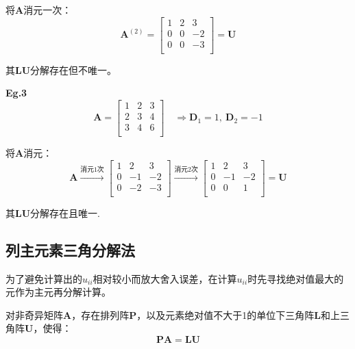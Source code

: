 将$\boldsymbol{A}$消元一次：
\begin{equation*}
    \boldsymbol{A}^{(2)} = \begin{bmatrix}
        1 & 2 & 3 \\
        0 & 0 & -2 \\
        0 & 0 & -3 \\
    \end{bmatrix} = \boldsymbol{U}
\end{equation*}

其$\boldsymbol{LU}$分解存在但不唯一。


\textbf{Eg.3}
\begin{equation*}
    \boldsymbol{A} = \begin{bmatrix}
        1 & 2 & 3 \\
        2 & 3 & 4 \\
        3 & 4 & 6 \\
    \end{bmatrix}\quad
    \Rightarrow \boldsymbol{D}_1 = 1,\ \boldsymbol{D}_2 = -1
\end{equation*}

将$\boldsymbol{A}$消元：
\begin{equation*}
    \boldsymbol{A} \overset{\text{消元1次}}{\longrightarrow} \begin{bmatrix}
        1 & 2 & 3 \\
        0 & -1 & -2 \\
        0 & -2 & -3 \\
    \end{bmatrix} \overset{\text{消元2次}}{\longrightarrow}
    \begin{bmatrix}
        1 & 2 & 3 \\
        0 & -1 & -2 \\
        0 & 0 & 1 \\
    \end{bmatrix} = \boldsymbol{U}
\end{equation*}

其$\boldsymbol{LU}$分解存在且唯一.

\newpage
\subsection{列主元素三角分解法}
为了避免计算出的$u_{ii}$相对较小而放大舍入误差，在计算$u_{ii}$时先寻找绝对值最大的元作为主元再分解计算。

\begin{th4}
    对非奇异矩阵$\boldsymbol{A}$，存在排列阵$\boldsymbol{P}$，以及元素绝对值不大于1的单位下三角阵$\boldsymbol{L}$和上三角阵$\boldsymbol{U}$，使得：
    \begin{equation*}
        \boldsymbol{PA} = \boldsymbol{LU}
    \end{equation*}
\end{th4}

